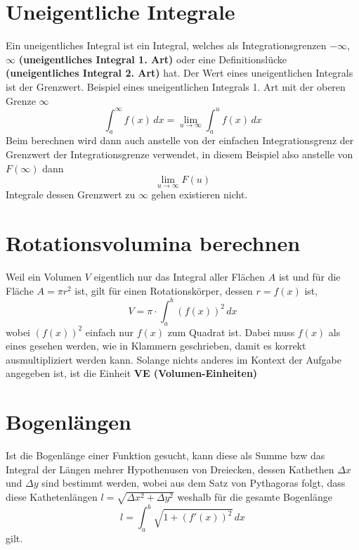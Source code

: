 \documentclass{article}
\begin{document}
\section{Uneigentliche Integrale}
Ein uneigentliches Integral ist ein Integral, welches als Integrationsgrenzen $-\infty$, $\infty$ \textbf{(uneigentliches Integral 1. Art)} oder eine Definitionslücke \textbf{(uneigentliches Integral 2. Art)} hat.
Der Wert eines uneigentlichen Integrals ist der Grenzwert. \newline
Beispiel eines uneigentlichen Integrals 1. Art mit der oberen Grenze $\infty$ 
\[\int_a^\infty f(x)\,dx = \lim_{u \to \infty} \int_a^u f(x)\,dx\] 
Beim berechnen wird dann auch anstelle von der einfachen Integrationsgrenz der Grenzwert der Integrationsgrenze verwendet, in diesem Beispiel also anstelle von $F(\infty)$ dann
\[\lim_{u \to \infty} F(u)\] 
Integrale dessen Grenzwert zu $\infty$ gehen existieren nicht.
 
\section{Rotationsvolumina berechnen}
Weil ein Volumen $V$ eigentlich nur das Integral aller Flächen $A$ ist und für die Fläche $A=\pi r^2$ ist, gilt für einen Rotationskörper, dessen $r=f(x)$ ist,
\[V = \pi \cdot \int_a^b (f(x))^2 \, dx\]
wobei $(f(x))^2$ einfach nur $f(x)$ zum Quadrat ist. Dabei muss $f(x)$ als eines gesehen werden, wie in Klammern geschrieben, damit es korrekt ausmultipliziert werden kann. \newline
Solange nichts anderes im Kontext der Aufgabe angegeben ist, ist die Einheit \textbf{VE (Volumen-Einheiten)} 
 
\section{Bogenlängen}
Ist die Bogenlänge einer Funktion gesucht, kann diese als Summe bzw das Integral der Längen mehrer Hypothenusen von Dreiecken, dessen Kathethen $\Delta x$ und $\Delta y$ sind bestimmt werden, wobei aus dem Satz von Pythagoras folgt, dass diese Kathetenlängen $l = \sqrt{\Delta x^2 + \Delta y^2}$
weshalb für die gesamte Bogenlänge
\[l = \int_a^b \sqrt{1+(f'(x))^2} \, dx\] 
gilt.
 
\end{document}
